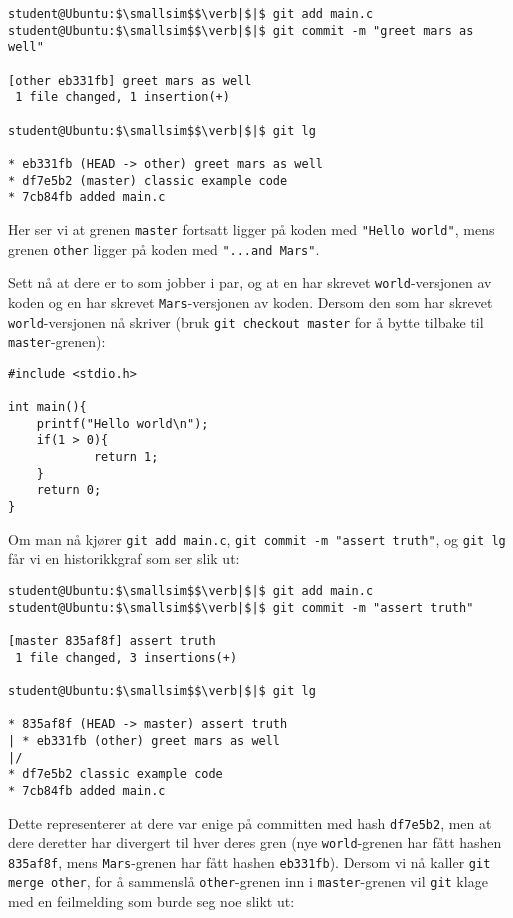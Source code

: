 \begin{alphasection}
\begin{lstlisting}[mathescape=true]
student@Ubuntu:$\smallsim$$\verb|$|$ git add main.c
student@Ubuntu:$\smallsim$$\verb|$|$ git commit -m "greet mars as well"

[other eb331fb] greet mars as well
 1 file changed, 1 insertion(+)

student@Ubuntu:$\smallsim$$\verb|$|$ git lg

* eb331fb (HEAD -> other) greet mars as well
* df7e5b2 (master) classic example code
* 7cb84fb added main.c
\end{lstlisting}


Her ser vi at grenen \verb|master| fortsatt ligger på koden med \verb|"Hello world"|, mens grenen \verb|other| ligger på koden med \verb|"...and Mars"|.

Sett nå at dere er to som jobber i par, og at en har skrevet \verb|world|-versjonen av koden og en har skrevet \verb|Mars|-versjonen av koden. Dersom den som har skrevet \verb|world|-versjonen nå skriver (bruk \verb|git checkout master| for å bytte tilbake til \verb|master|-grenen):



\begin{lstlisting}
#include <stdio.h>

int main(){
    printf("Hello world\n");
    if(1 > 0){
            return 1;
    }
    return 0;
}
\end{lstlisting}

Om man nå kjører \verb|git add main.c|, \verb|git commit -m "assert truth"|, og \verb|git lg| får vi en historikkgraf som ser slik ut:

\begin{lstlisting}[mathescape=true]
student@Ubuntu:$\smallsim$$\verb|$|$ git add main.c
student@Ubuntu:$\smallsim$$\verb|$|$ git commit -m "assert truth"

[master 835af8f] assert truth
 1 file changed, 3 insertions(+)

student@Ubuntu:$\smallsim$$\verb|$|$ git lg

* 835af8f (HEAD -> master) assert truth
| * eb331fb (other) greet mars as well
|/  
* df7e5b2 classic example code
* 7cb84fb added main.c
\end{lstlisting}


Dette representerer at dere var enige på committen med hash \verb|df7e5b2|, men at dere deretter har divergert til hver deres gren (nye \verb|world|-grenen har fått hashen \verb|835af8f|, mens \verb|Mars|-grenen har fått hashen \verb|eb331fb|). Dersom vi nå kaller \verb|git merge other|, for å sammenslå \verb|other|-grenen inn i \verb|master|-grenen vil \verb|git| klage med en feilmelding som burde seg noe slikt ut:


\end{alphasection}
